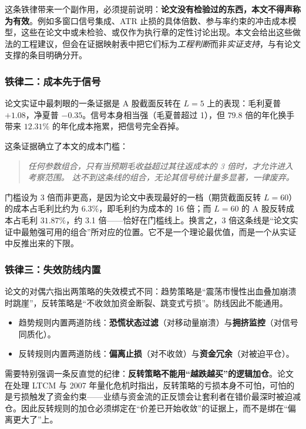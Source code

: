 这条铁律带来一个副作用，必须提前说明：\textbf{论文没有检验过的东西，本文不得声称为有效}。例如多窗口信号集成、ATR 止损的具体倍数、参与率约束的冲击成本模型，这些在论文中或未检验、或仅作为执行章的定性讨论出现。本文会给出这些做法的工程建议，但会在证据映射表中把它们标为\emph{工程判断}而非\emph{实证支持}，与有论文支撑的条目明确分开。

\subsubsection*{铁律二：成本先于信号}

论文实证中最刺眼的一条证据是 A 股截面反转在 $L=5$ 上的表现：毛利夏普 $+1.08$，净夏普 $-0.35$。信号本身相当强（毛夏普超过 1），但 $79.8$ 倍的年化换手带来 $12.31\%$ 的年化成本拖累，把信号完全吞掉。

这条证据确立了本文的成本门槛：

\begin{quote}
\itshape
任何参数组合，只有当预期毛收益超过其往返成本的 3 倍时，才允许进入考察范围。
达不到这条线的组合，无论其信号统计量多显著，一律废弃。
\end{quote}

门槛设为 3 倍而非更高，是因为论文中表现最好的一档（期货截面反转 $L=60$）的成本占毛利比约为 $6.3\%$，即毛利约为成本的 16 倍；而 $L=60$ 的 A 股反转成本占毛利 $31.87\%$，约 3.1 倍——恰好在门槛线上。换言之，3 倍这条线是“论文实证中最勉强可用的组合”所对应的位置。它不是一个理论最优值，而是一个从实证中反推出来的下限。

\subsubsection*{铁律三：失效防线内置}

论文的对偶六指出两策略的失效模式不同：趋势策略是“震荡市慢性出血叠加崩溃时跳崖”，反转策略是“不收敛加资金断裂、跳变式亏损”。防线因此不能通用。

\begin{itemize}[leftmargin=2.2em]
  \item 趋势规则内置两道防线：\textbf{恐慌状态过滤}（对移动量崩溃）与\textbf{拥挤监控}（对信号同质化）。
  \item 反转规则内置两道防线：\textbf{偏离止损}（对不收敛）与\textbf{资金冗余}（对被迫平仓）。
\end{itemize}

需要特别强调一条反直觉的纪律：\textbf{反转策略不能用“越跌越买”的逻辑加仓}。论文在处理 LTCM 与 2007 年量化危机时指出，反转策略的亏损本身不可怕，可怕的是亏损触发了资金约束——业绩与资金流的正反馈会让套利者在错价最深时被迫减仓\cite{shleifervishny1997,khandanilo2011}。因此反转规则的加仓必须绑定在“价差已开始收敛”的证据上，而不是绑在“偏离更大了”上。


